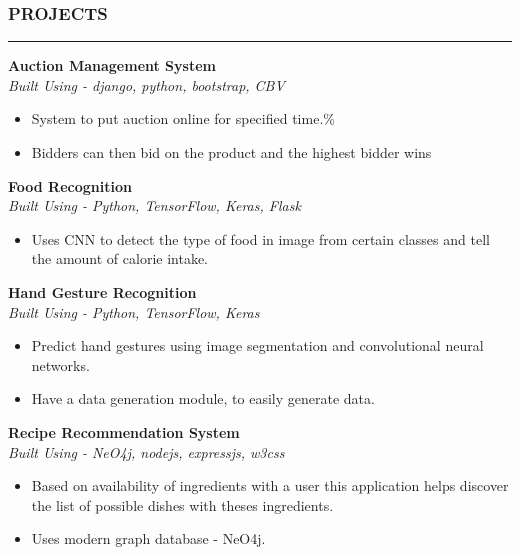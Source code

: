\documentclass[a4paper]{article}
\begin{document}
\subsubsection*{PROJECTS}
\hrule

\vspace{10pt}
\noindent
\textbf{Auction Management System} \\
\textit{Built Using - django, python, bootstrap, CBV}
\begin{itemize}[leftmargin=*, nosep]
    \item System to put auction online for specified time.\%
    \item Bidders can then bid on the product and the highest bidder wins
\end{itemize}

\vspace{10pt}
\noindent
\textbf{Food Recognition} \\
\textit{Built Using - Python, TensorFlow, Keras, Flask}
\begin{itemize} [leftmargin=*, nosep]
    \item Uses CNN to detect the type of food in image from certain classes and tell the amount of calorie intake.
\end{itemize}

\vspace{10pt}
\noindent
\textbf{Hand Gesture Recognition} \\
\textit{Built Using - Python, TensorFlow, Keras}
\begin{itemize} [leftmargin=*, nosep]
    \item Predict hand gestures using image segmentation and convolutional neural networks.
    \item Have a data generation module, to easily generate data.
\end{itemize}

\vspace{10pt}
\noindent
\textbf{Recipe Recommendation System} \\
\textit{Built Using - NeO4j, nodejs, expressjs, w3css}
\begin{itemize}[leftmargin=*, nosep]
    \item Based on availability of ingredients with a user this application
          helps discover the list of possible dishes with theses ingredients.
    \item Uses modern graph database - NeO4j.
\end{itemize}
\end{document}
